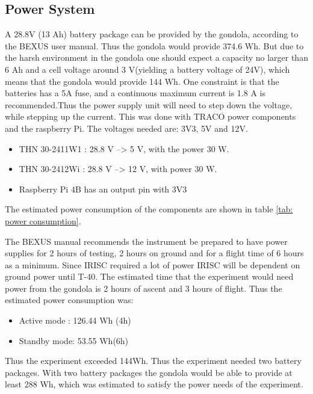 \pagebreak
\subsection{Power System}

\label{sec:4.7}

A 28.8V (13 Ah) battery package can be provided by the gondola, according to the BEXUS user manual. Thus the gondola would provide 374.6 Wh. But due to the harsh environment in the gondola one should expect a capacity no larger than 6 Ah and a cell voltage around 3 V(yielding a battery voltage of 24V), which means that the gondola would provide 144 Wh. One constraint is that the batteries has a 5A fuse, and a continuous maximum current is 1.8 A is recommended.Thus the power supply unit will need to step down the voltage, while stepping up the current. This was done with TRACO power components and the raspberry Pi. The voltages needed are: 3V3, 5V and 12V.

\begin{itemize}
	\item THN 30-2411W1 : 28.8 V --> 5 V, with the power 30 W.
	\item THN 30-2412Wi : 28.8 V --> 12 V, with power 30 W.
	\item Raspberry Pi 4B has an output pin with 3V3
\end{itemize}


The estimated power consumption of the components are shown in table \ref{tab: power consumption}.



The BEXUS manual recommends the instrument be prepared to have power supplies for 2 hours of testing, 2 hours on ground and for a flight time of 6 hours as a minimum. Since IRISC required a lot of power IRISC will be dependent on ground power  until T-40. The estimated time that the experiment would need power from the gondola is 2 hours of ascent and 3 hours of flight. Thus the estimated power consumption was:  

\begin{itemize}
    \item Active mode : 126.44 Wh (4h) 
    \item Standby mode: 53.55 Wh(6h)
\end{itemize}

Thus the experiment exceeded 144Wh. Thus the experiment needed two battery packages. With two battery packages the gondola would be able to provide at least 288 Wh, which was estimated to satisfy the power needs of the experiment.



\raggedbottom
